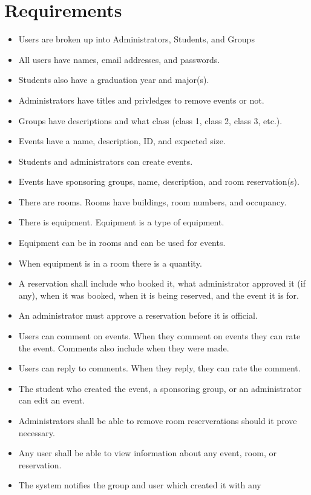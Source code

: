 \documentclass{article}
\begin{document}
\section{Requirements}
\begin{itemize}
\item Users are broken up into Administrators, Students, and Groups
\item All users have names, email addresses, and passwords.
\item Students also have a graduation year and major(s).
\item Administrators have titles and privledges to remove events or not. 
\item Groups have descriptions and what class (class 1, class 2, class 3, etc.).
\item Events have a name, description, ID, and expected size.
\item Students and administrators can create events.
\item Events have sponsoring groups, name, description, and room reservation(s).
\item There are rooms. Rooms have buildings, room numbers, and occupancy.
\item There is equipment. Equipment is a type of equipment.
\item Equipment can be in rooms and can be used for events.
\item When equipment is in a room there is a quantity.
\item A reservation shall include who booked it, what administrator
approved it (if any), when it was booked, when it is being reserved,
and the event it is for.
\item An administrator must approve a reservation before it is official.
\item Users can comment on events. When they comment on events they can rate the
event. Comments also include when they were made. 
\item Users can reply to comments. When they reply, they can rate the comment. 
\item The student who created the event, a sponsoring group, or an
administrator can edit an event.
\item Administrators shall be able to remove room reserverations
should it prove necessary.
\item Any user shall be able to view information about any event,
room, or reservation.
\item The system notifies the group and user which created it with any

\end{itemize}
\end{document}

